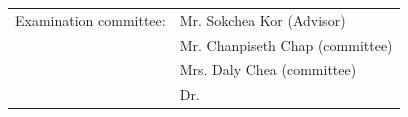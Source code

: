 \begin{titlepage}
    \vspace{2.5cm}

    {\englishfont
    \begin{center}
        \begin{tabular}{ll}
            {Examination committee:} & Mr. Sokchea Kor (Advisor) \\
                                            & Mr. Chanpiseth Chap (committee) \\
                                            & Mrs. Daly Chea (committee)\\
                                            & Dr. \dotfill
        \end{tabular}
    \end{center}
    }


    \vfill
\end{titlepage}
